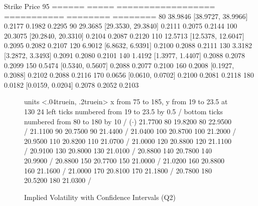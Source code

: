 Strike     Price     95%
======     =====     ==================    ===========    ========    ========
    80    38.9846   [38.9727, 38.9966]       0.2177     0.1982     0.2295
    90    29.3685   [29.3530, 29.3840]       0.2111     0.2075     0.2144
   100    20.3075   [20.2840, 20.3310]       0.2104     0.2087     0.2120
   110    12.5713   [12.5378, 12.6047]       0.2095     0.2082     0.2107
   120     6.9012   [6.8632, 6.9391]       0.2100     0.2088     0.2111
   130     3.3182   [3.2872, 3.3493]       0.2091     0.2080     0.2101
   140     1.4192   [1.3977, 1.4407]       0.2088     0.2078     0.2099
   150     0.5474   [0.5340, 0.5607]       0.2088     0.2077     0.2100
   160     0.2008   [0.1927, 0.2088]       0.2102     0.2088     0.2116
   170     0.0656   [0.0610, 0.0702]       0.2100     0.2081     0.2118
   180     0.0182   [0.0159, 0.0204]       0.2078     0.2052     0.2103


\begin{figure}[h!]
\centering
\beginpicture
\setcoordinatesystem units <.04truein, .2truein> 
\setplotarea x from 75 to 185, y from  19 to 23.5
 at 130 24
\axis left ticks numbered from 19 to 23.5 by 0.5 /
\axis bottom ticks numbered from 80 to 180 by 10 /
\setplotsymbol ({$\cdot$})
 21.7700 80 19.8200 80 22.9500 /
 21.1100 90 20.7500 90 21.4400 /
 21.0400 100 20.8700 100 21.2000 /
 20.9500 110 20.8200 110 21.0700 /
 21.0000 120 20.8800 120 21.1100 /
 20.9100 130 20.8000 130 21.0100 /
 20.8800 140 20.7800 140 20.9900 /
 20.8800 150 20.7700 150 21.0000 /
 21.0200 160 20.8800 160 21.1600 /
 21.0000 170 20.8100 170 21.1800 /
 20.7800 180 20.5200 180 21.0300 /
\endpicture
\caption{Implied Volatility with Confidence Intervals (Q2)}
\end{figure}


